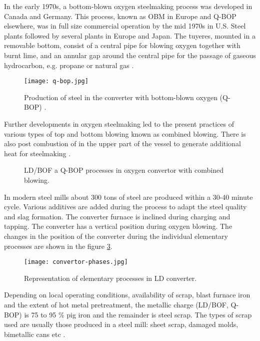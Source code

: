 In the early 1970s, a bottom-blown oxygen steelmaking process was developed in Canada and Germany. This process, known as OBM in Europe and Q-BOP elsewhere, was in full size commercial operation by the mid 1970s in U.S. Steel plants followed by several plants in Europe and Japan. The tuyeres, mounted in a removable bottom, consist of a central pipe for blowing oxygen together with burnt lime, and an annular gap around the central pipe for the passage of gaseous hydrocarbon, e.g. propane or natural gas \citep{Turkdogan1996}.

\begin{figure}[h!]
	\centering
	\texttt{[image: q-bop.jpg]}
	\caption{Production of steel in the converter with bottom-blown oxygen (Q-BOP) \citep{Turkdogan1996}.}
	\label{o:2}
\end{figure}

Further developments in oxygen steelmaking led to the present practices of various types of top and bottom blowing known as combined blowing. There is also post combustion of  in the upper part of the vessel to generate additional heat for steelmaking \citep{Turkdogan1996}.

\begin{figure}[h!tbp]
	\centering
	\hfill
	\caption{LD/BOF a Q-BOP processes in oxygen convertor with combined blowing.}
	\label{o:3}
\end{figure}

In modern steel mills about 300 tons of steel are produced within a 30-40 minute cycle. Various additives are added during the process to adapt the steel quality and slag formation. The converter furnace is inclined during charging and tapping. The converter has a vertical position during oxygen blowing. The changes in the position of the converter during the individual elementary processes are shown in the figure \ref{o:4}.

\begin{figure}[h!]
	\centering
	\texttt{[image: convertor-phases.jpg]}
	\caption{Representation of elementary processes in LD converter.}
	\label{o:4}
\end{figure}

Depending on local operating conditions, availability of scrap, blast furnace iron and the extent of hot metal pretreatment, the metallic charge (LD/BOF, Q-BOP) is 75 to 95 \% pig iron and the remainder is steel scrap. The types of scrap used are usually those produced in a steel mill: sheet scrap, damaged molds, bimetallic cans etc \cite{Turkdogan1996}.

